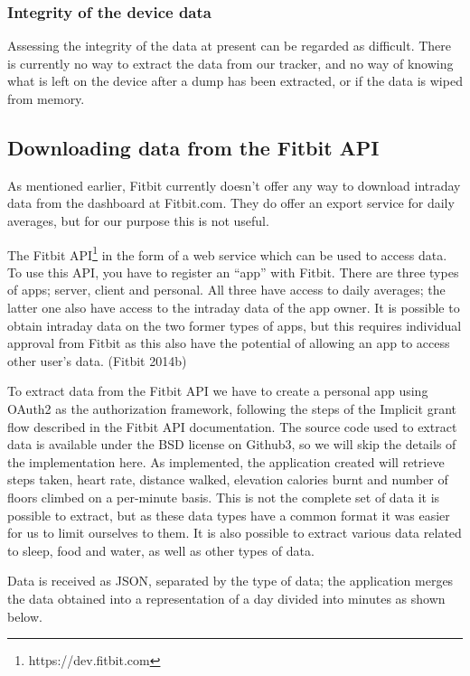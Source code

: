 \documentclass[a4paper,11pt,dvips]{article}
\begin{document}
\subsubsection{Integrity of the device data}
Assessing the integrity of the data at present can be regarded as difficult. There is currently no way to extract the data from our tracker, and no way of knowing what is left on the device after a dump has been extracted, or if the data is wiped from memory.


\subsection{Downloading data from the Fitbit API}
As mentioned earlier, Fitbit currently doesn't offer any way to download intraday data from the dashboard at Fitbit.com. They do offer an export service for daily averages, but for our purpose this is not useful.

The Fitbit API\footnote{https://dev.fitbit.com} in the form of a web service which can be used to access data. To use this API, you have to register an “app” with Fitbit. There are three types of apps; server, client and personal. All three have access to daily averages; the latter one also have access to the intraday data of the app owner. It is possible to obtain intraday data on the two former types of apps, but this requires individual approval from Fitbit as this also have the potential of allowing an app to access other user's data. (Fitbit 2014b)

To extract data from the Fitbit API we have to create a personal app using OAuth2 as the authorization framework, following the steps of the Implicit grant flow described in the Fitbit API documentation. The source code used to extract data is available under the BSD license on Github3, so we will skip the details of the implementation here. As implemented, the application created will retrieve steps taken, heart rate, distance walked, elevation calories burnt and number of floors climbed on a per-minute basis. This is not the complete set of data it is possible to extract, but as these data types have a common format it was easier for us to limit ourselves to them. It is also possible to extract various data related to sleep, food and water, as well as other types of data.

Data is received as JSON, separated by the type of data; the application merges the data obtained into a representation of a day divided into minutes as shown below.
\end{document}
